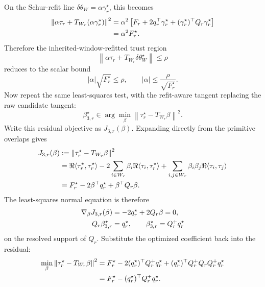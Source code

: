 \documentclass[10pt,twocolumn]{article}
\begin{document}
On the Schur-refit line \(\delta\theta_W=\alpha\gamma_r^\star\), this becomes
\begin{align}
\left\|\alpha\tau_r+T_{W_r}(\alpha\gamma_r^\star)\right\|^2
&=
\alpha^2
\left[
F_r+2q_r^\top\gamma_r^\star
+(\gamma_r^\star)^\top Q_r\gamma_r^\star
\right]
\notag\\
&=\alpha^2F_r^\star.
\label{eq:p1_phase3_trust_region_collapse}
\end{align}
Therefore the inherited-window-refitted trust region
\begin{equation}
\left\|\alpha\tau_r+T_{W_r}\delta\theta_W^\star\right\|\le\rho
\label{eq:p1_phase3_block_tr}
\end{equation}
reduces to the scalar bound
\begin{equation}
|\alpha|\sqrt{F_r^\star}\le\rho,
\qquad
|\alpha|\le\frac{\rho}{\sqrt{F_r^\star}}.
\label{eq:p1_phase3_alpha_bound}
\end{equation}
Now repeat the same least-squares test, with the refit-aware tangent replacing the raw candidate tangent:
\begin{equation}
\beta_{3,r}^\star\in
\arg\min_\beta
\left\|\tau_r^\star-T_{W_r}\beta\right\|^2.
\label{eq:p1_n3_ls}
\end{equation}
Write this residual objective as \(J_{3,r}(\beta)\). Expanding directly from the primitive overlaps gives
\begin{align}
J_{3,r}(\beta)
&:=\left\|\tau_r^\star-T_{W_r}\beta\right\|^2
\notag\\
&=
\Re\langle\tau_r^\star,\tau_r^\star\rangle
-2\sum_{i\in W_r}\beta_i\Re\langle\tau_i,\tau_r^\star\rangle
+\sum_{i,j\in W_r}\beta_i\beta_j\Re\langle\tau_i,\tau_j\rangle
\notag\\
&=F_r^\star-2\beta^\top q_r^\star+\beta^\top Q_r\beta.
\label{eq:p1_n3_expand}
\end{align}
The least-squares normal equation is therefore
\begin{align}
\nabla_\beta J_{3,r}(\beta)
&=-2q_r^\star+2Q_r\beta=0,
\notag\\
Q_r\beta_{3,r}^\star&=q_r^\star,
\qquad
\beta_{3,r}^\star=Q_r^+q_r^\star
\label{eq:p1_n3_normal}
\end{align}
on the resolved support of \(Q_r\).
Substitute the optimized coefficient back into the residual:
\begin{align}
\min_\beta\left\|\tau_r^\star-T_{W_r}\beta\right\|^2
&=
F_r^\star
-2(q_r^\star)^\top Q_r^+q_r^\star
+(q_r^\star)^\top Q_r^+Q_rQ_r^+q_r^\star
\notag\\
&=
F_r^\star-(q_r^\star)^\top Q_r^+q_r^\star .
\label{eq:p1_n3_residual}
\end{align}
\end{document}
